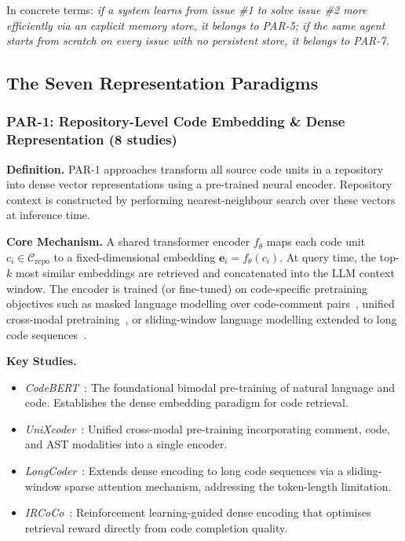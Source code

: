 \documentclass[acmsmall,screen,review]{acmart}
\begin{document}
In concrete terms: \emph{if a system learns from issue \#1 to solve
issue \#2 more efficiently via an explicit memory store, it belongs to
PAR-5; if the same agent starts from scratch on every issue with no
persistent store, it belongs to PAR-7.}

\subsection{The Seven Representation Paradigms}
\label{subsec:paradigms}

\subsubsection{PAR-1: Repository-Level Code Embedding \& Dense
  Representation (8 studies)}
\label{subsubsec:par1}

\textbf{Definition.} PAR-1 approaches transform all source code units
in a repository into dense vector representations using a pre-trained
neural encoder. Repository context is constructed by performing
nearest-neighbour search over these vectors at inference time.

\textbf{Core Mechanism.} A shared transformer encoder $f_\theta$ maps
each code unit $c_i \in \mathcal{C}_{\text{repo}}$ to a fixed-dimensional
embedding $\mathbf{e}_i = f_\theta(c_i)$. At query time, the top-$k$
most similar embeddings are retrieved and concatenated into the LLM
context window. The encoder is trained (or fine-tuned) on code-specific
pretraining objectives such as masked language modelling over
code-comment pairs~\cite{Feng2020CodeBERT}, unified cross-modal
pretraining~\cite{Guo2022UniX}, or sliding-window language modelling
extended to long code
sequences~\cite{Guo2023LongCoder}.

\textbf{Key Studies.}
\begin{itemize}
  \item \textit{CodeBERT}~\cite{Feng2020CodeBERT}: The foundational
    bimodal pre-training of natural language and code. Establishes the
    dense embedding paradigm for code retrieval.
  \item \textit{UniXcoder}~\cite{Guo2022UniX}: Unified cross-modal
    pre-training incorporating comment, code, and AST modalities into a
    single encoder.
  \item \textit{LongCoder}~\cite{Guo2023LongCoder}: Extends dense
    encoding to long code sequences via a sliding-window sparse attention
    mechanism, addressing the token-length limitation.
  \item \textit{IRCoCo}~\cite{Li2024IRCoCo}: Reinforcement
    learning-guided dense encoding that optimises retrieval reward
    directly from code completion quality.
\end{itemize}
\end{document}
